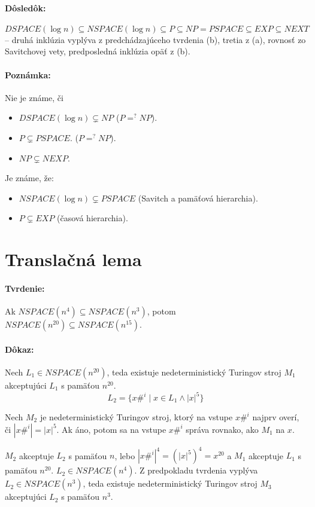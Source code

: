\documentclass{article}
\begin{document}
\paragraph{Dôsledôk:} $DSPACE(\log n)\subseteq NSPACE(\log n) \subseteq P
\subseteq NP = PSPACE \subseteq EXP \subseteq NEXT$ --
druhá inklúzia vyplýva z predchádzajúceho tvrdenia (b), tretia z (a), rovnosť zo
Savitchovej vety, predposledná inklúzia opäť z (b).

\paragraph{Poznámka:} Nie je známe, či
\begin{itemize}
	\item $DSPACE(\log n) \subsetneq NP$
($P=^?NP$). 
	\item $P \subsetneq PSPACE$. ($P=^?NP$).
	\item $NP \subsetneq NEXP$. 
\end{itemize}

Je známe, že:
\begin{itemize}
	\item $NSPACE(\log n) \subsetneq PSPACE$ (Savitch a
pamäťová hierarchia). 
	\item $P \subsetneq EXP$ (časová hierarchia).
\end{itemize}

\section{Translačná lema}
\paragraph{Tvrdenie:} Ak $NSPACE(n^4) \subseteq NSPACE(n^3)$, potom
$NSPACE(n^{20}) \subseteq NSPACE(n^{15})$.
\paragraph{Dôkaz:} Nech $L_1 \in NSPACE(n^{20})$, teda existuje
nedeterministický Turingov stroj $M_1$ akceptujúci $L_1$ s pamäťou $n^{20}$.
$$
	L_2 = \{ x\#^i \mid x \in L_1 \land |x|^5\}
$$

Nech $M_2$ je nedeterministický Turingov stroj, ktorý na vstupe  $x\#^i$ najprv
overí, či $|x\#^i| = |x|^5$. Ak áno, potom sa na vstupe $x\#^i$ správa rovnako,
ako $M_1$ na $x$.

\par $M_2$ akceptuje $L_2$ s pamäťou $n$, lebo $|x\#^i|^4 = (|x|^5)^4 = x^{20}$ a
$M_1$ akceptuje $L_1$ s pamäťou $n^{20}$. $L_2 \in NSPACE(n^4)$. Z predpokladu
tvrdenia vyplýva $L_2 \in NSPACE(n^3)$, teda existuje nedeterministický Turingov
stroj $M_3$ akceptujúci $L_2$ s pamäťou $n^3$. 
\end{document}
